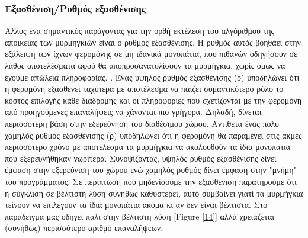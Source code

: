 \subsubsection{Εξασθένιση/Ρυθμός εξασθένισης}
Άλλος ένα σημαντικός παράγοντας για την ορθή εκτέλεση του αλγόριθμου της αποικείας των μυρμηγκιών είναι ο ρυθμός εξασθένισης. Η ρυθμός αυτός βοηθάει στην εξάλειψη των ίχνων φερομόνης σε μη ιδανικά μονοπάτια, που πιθανών οδηγήσουν σε λάθος αποτελέσματα αφού θα αποπροσανατολίσουν τα μυρμήγκια, χωρίς όμως να έχουμε απώλεια πληροφορίας. \cite{mavrovouniotis2014ant}. Ένας υψηλός ρυθμός εξασθένισης (ρ) υποδηλώνει ότι η φερομόνη εξασθενεί ταχύτερα με αποτέλεσμα να παίζει συμαντικότερο ρόλο το κόστος επιλογής κάθε διαδρομής και οι πληροφορίες που σχετίζονται με την φερομόνη από προηγούμενες επαναλήψεις να χάνονται πιο γρήγορα. Δηλαδή, δίνεται περισσότερη βάση στην εξερεύνηση του διαθέσιμου χώρου. Αντίθετα ένας πολύ χαμηλός ρυθμός εξασθένισης (ρ) υποδηλώνει ότι η φερομόνη θα παραμένει στις ακμές περισσότερο χρόνο με αποτέλεσμα τα μυρμήγκια να ακολουθούν τα ίδια μονοπάτια που εξερευνήθηκαν νωρίτερα.
Συνοψίζοντας, υψηλός ρυθμός εξασθένισης δίνει έμφαση στην εξερεύνιση του χώρου ενώ χαμηλός ρυθμός δίνει έμφαση στην "μνήμη" του προγράμματος. Σε περίπτωση που μηδενίσουμε την εξασθένιση παρατηρούμε ότι η σύγκλιση σε βέλτιστη λύση συνήθως καθυστερεί, αυτό συμβαίνει γιατί τα μυρμήγκια τείνουν να επιλέγουν τα ίδια μονοπάτια ακόμα κι αν δεν είναι βέλτιστα. Στο παραδειγμα μας οδηγεί πάλι στην βέλτιστη λύση [Figure \ref{14}] αλλά χρειάζεται (συνήθως) περισσότερο αριθμό επαναλήψεων.


